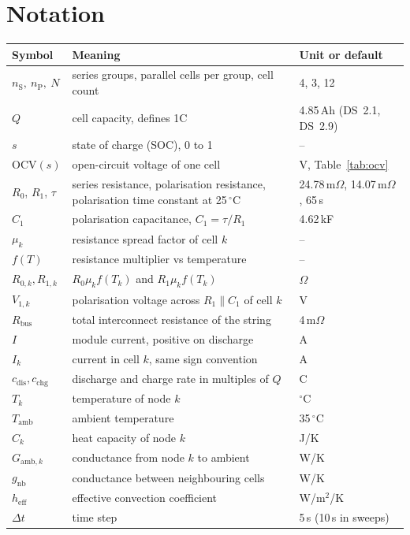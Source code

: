 \documentclass[11pt,a4paper]{article}
\newcommand{\ds}[1]{\textsc{DS}~#1}
\newcommand{\degC}{\ensuremath{{}^{\circ}\mathrm{C}}}
\newcommand{\Rbus}{R_{\mathrm{bus}}}
\newcommand{\nS}{n_{\mathrm{S}}}
\newcommand{\nP}{n_{\mathrm{P}}}
\begin{document}
\section{Notation}
\begin{longtable}{@{}p{2.3cm}p{8.4cm}p{3.6cm}@{}}
\toprule
Symbol & Meaning & Unit or default \\
\midrule
\endhead
$\nS,\ \nP,\ N$ & series groups, parallel cells per group, cell count & 4, 3, 12 \\
$Q$ & cell capacity, defines 1C & 4.85\,Ah (\ds{2.1}, \ds{2.9}) \\
$s$ & state of charge (SOC), 0 to 1 & -- \\
$\mathrm{OCV}(s)$ & open-circuit voltage of one cell & V, Table~\ref{tab:ocv} \\
$R_{0}$, $R_{1}$, $\tau$ & series resistance, polarisation resistance, polarisation time constant at 25\,\degC & 24.78\,m$\Omega$, 14.07\,m$\Omega$, 65\,s \\
$C_1$ & polarisation capacitance, $C_1=\tau/R_1$ & 4.62\,kF \\
$\mu_k$ & resistance spread factor of cell $k$ & -- \\
$f(T)$ & resistance multiplier vs temperature & -- \\
$R_{0,k},R_{1,k}$ & $R_0\mu_kf(T_k)$ and $R_1\mu_kf(T_k)$ & $\Omega$ \\
$V_{1,k}$ & polarisation voltage across $R_1\parallel C_1$ of cell $k$ & V \\
$\Rbus$ & total interconnect resistance of the string & 4\,m$\Omega$ \\
$I$ & module current, positive on discharge & A \\
$I_k$ & current in cell $k$, same sign convention & A \\
$c_{\mathrm{dis}},c_{\mathrm{chg}}$ & discharge and charge rate in multiples of $Q$ & C \\
$T_k$ & temperature of node $k$ & \degC \\
$T_{\mathrm{amb}}$ & ambient temperature & 35\,\degC \\
$C_k$ & heat capacity of node $k$ & J/K \\
$G_{\mathrm{amb},k}$ & conductance from node $k$ to ambient & W/K \\
$g_{\mathrm{nb}}$ & conductance between neighbouring cells & W/K \\
$h_{\mathrm{eff}}$ & effective convection coefficient & W/m$^2$/K \\
$\Delta t$ & time step & 5\,s (10\,s in sweeps) \\
\bottomrule
\end{longtable}
\end{document}
